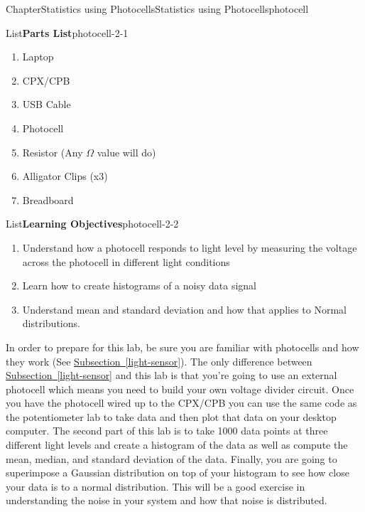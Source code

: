 \documentclass[oneside,10pt,]{book}
\newcommand{\xreffont}{\relax}
\newcommand{\linkhilite}[1]{\underline{#1}}
\numberwithin{equation}{section}
\begin{document}
\begin{chapterptx}{Chapter}{Statistics using Photocells}{}{Statistics using Photocells}{}{}{photocell}
\renewcommand*{\chaptername}{Chapter}
\begin{introduction}{}%
\begin{listptx}{List}{\textbf{Parts List}}{photocell-2-1}{}%
%
\begin{enumerate}
\item{}Laptop%
\item{}CPX\slash{}CPB%
\item{}USB Cable%
\item{}Photocell%
\item{}Resistor (Any \(\Omega\) value will do)%
\item{}Alligator Clips (x3)%
\item{}Breadboard%
\end{enumerate}
\end{listptx}%
\begin{listptx}{List}{\textbf{Learning Objectives}}{photocell-2-2}{}%
%
\begin{enumerate}
\item{}Understand how a photocell responds to light level by measuring the voltage across the photocell in different light conditions%
\item{}Learn how to create histograms of a noisy data signal%
\item{}Understand mean and standard deviation and how that applies to Normal distributions.%
\end{enumerate}
\end{listptx}%
In order to prepare for this lab, be sure you are familiar with photocells and how they work (See \hyperref[light-sensor]{\linkhilite{Subsection~{\xreffont\ref{light-sensor}}}}). The only difference between \hyperref[light-sensor]{\linkhilite{Subsection~{\xreffont\ref{light-sensor}}}} and this lab is that you're going to use an external photocell which means you need to build your own voltage divider circuit. Once you have the photocell wired up to the CPX\slash{}CPB you can use the same code as the potentiometer lab to take data and then plot that data on your desktop computer. The second part of this lab is to take 1000 data points at three different light levels and create a histogram of the data as well as compute the mean, median, and standard deviation of the data. Finally, you are going to superimpose a Gaussian distribution on top of your histogram to see how close your data is to a normal distribution. This will be a good exercise in understanding the noise in your system and how that noise is distributed.%

\end{introduction}
\end{chapterptx}
\end{document}
